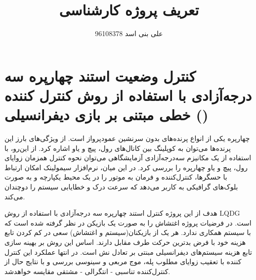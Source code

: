 \documentclass[12 pt]{article}
\title{تعریف پروژه کارشناسی}
\author{علی بنی اسد 96108378}
\begin{document}
	\maketitle
	\section*{کنترل وضعیت استند چهارپره
		 سه درجه‌آزادی 
		با استفاده از روش کنترل کننده خطی مبتنی بر بازی دیفرانسیلی
()	}





چهارپره یکی از انواع پرنده‌های بدون سرنشین عمودپرواز است. از ویژگی‌های بارز این پرنده‌ها می‌توان به کوپلینگ بین کانال‌های رول، پیچ و یاو اشاره کرد. از این‌رو، با استفاده از یک مکانیزم ‌سه‌درجه‌آزادی آزمایشگاهی می‌توان نحوه کنترل همزمان زوایای رول، پیچ و یاو چهارپره را بررسی کرد. در این میان، نرم‌افزار‌ سیمولینک امکان ارتباط با حسگرها، کنترل‌کننده و فرمان به موتور را در یک محیط یکپارچه و به ‌صورت بلوک‌های گرافیکی به کاربر می‌دهد که سرعت درک و خطا‌یابی سیستم را دوچندان می‌کند.



هدف از این پروژه کنترل استند چهارپره سه درجه‌آزادی با استفاده از روش LQDG است. در فرضیات پروژه اغتشاش را به صورت یک بازیکن در نظر گرفته شده است که با سیستم همکاری ندارد. هر یک از بازیکنان(سیستم و اغتشاش) سعی در کم کردن تابع هزینه خود با فرض بدترین حرکت طرف مقابل دارند. اساس این روش بر بهینه سازی تابع هزینه سیستم‌های دیفرانسیلی مبنتی بر تعادل نش 
است. در انتها عملکرد این کنترل کننده با تعقیب زوایای مطلوب پله، موج مربعی و سینوسی بررسی و با نتایج حال از کنترل‌کننده  تناسبی - انتگرالی -
مشتقی مقایسه خواهد‌شد.
\end{document}
